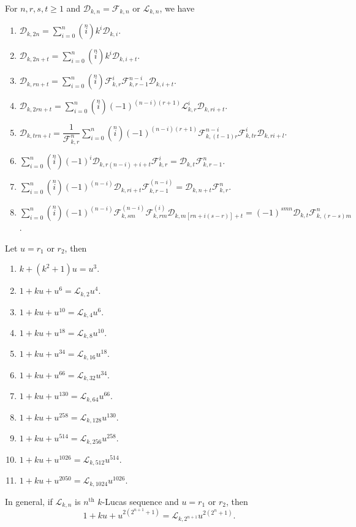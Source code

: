 \begin{theorem}For $n, r, s, t\geq 1$ and $\mathcal{D}_{k,n}=\mathcal{F}_{k,n}$ or $\mathcal{L}_{k,n}$, we have\label{3.3}
\begin{enumerate}
\item $\mathcal{D}_{k,2n}=\sum\limits_{i=0}^{n}\left( \stackrel{n}{i}\right) k^{i}\mathcal{D}_{k,i} $.
\item $\mathcal{D}_{k,2n+t}=\sum\limits_{i=0}^{n}\left( \stackrel{n}{i}\right) k^{i}\mathcal{D}_{k,i+t} $.
\item $\mathcal{D}_{k,rn+t}=\sum\limits_{i=0}^{n}\left( \stackrel{n}{i}\right) \mathcal{F}_{k,r}^{i}\mathcal{F}_{k,r-1}^{n-i}\mathcal{D}_{k,i+t} $.
\item $\mathcal{D}_{k,2rn+t}=\sum\limits_{i=0}^{n}\left( \stackrel{n}{i}\right)(-1)^{(n-i)(r+1)} \mathcal{L}_{k,r}^{i}\mathcal{D}_{k,ri+t} $.
\item $\mathcal{D}_{k,trn+l}=\dfrac{1}{\mathcal{F}_{k,r}^{n}}\sum\limits_{i=0}^{n}\left( \stackrel{n}{i}\right)(-1)^{(n-i)(r+1)} \mathcal{F}_{k,(t-1)r}^{n-i}\mathcal{F}_{k,tr}^{i}\mathcal{D}_{k,ri+l} $.
\item $\sum\limits_{i=0}^{n}\left( \stackrel{n}{i}\right)(-1)^{i} \mathcal{D}_{k,r(n-i)+i+t}\mathcal{F}_{k,r}^{i}=\mathcal{D}_{k,t}\mathcal{F}_{k,r-1}^{n} $.
\item $\sum\limits_{i=0}^{n}\left( \stackrel{n}{i}\right)(-1)^{(n-i)} \mathcal{D}_{k,ri+t}\mathcal{F}_{k,r-1}^{(n-i)}=\mathcal{D}_{k,n+t}\mathcal{F}_{k,r}^{n} $.
\item $\sum\limits_{i=0}^{n}\left( \stackrel{n}{i}\right)(-1)^{(n-i)}\mathcal{F}_{k,sm}^{(n-i)}\mathcal{F}_{k,rm}^{(i)} \mathcal{D}_{k,m[rn+i(s-r)]+t}=(-1)^{smn}\mathcal{D}_{k,t}\mathcal{F}_{k,(r-s)m}^{n} $.
\end{enumerate}
\end{theorem}
\begin{lemma}
Let $u=r_{1}$ or $r_{2}$, then\label{3.4}
\begin{enumerate}
\item $k+(k^2+1)u=u^3$.
\item $1+ku+u^6=\mathcal{L}_{k,2}u^4$.
\item $1+ku+u^{10}=\mathcal{L}_{k,4}u^6$.
\item $1+ku+u^{18}=\mathcal{L}_{k,8}u^{10}$.
\item $1+ku+u^{34}=\mathcal{L}_{k,16}u^{18}$.
\item $1+ku+u^{66}=\mathcal{L}_{k,32}u^{34}$.
\item $1+ku+u^{130}=\mathcal{L}_{k,64}u^{66}$.
\item $1+ku+u^{258}=\mathcal{L}_{k,128}u^{130}$.
\item $1+ku+u^{514}=\mathcal{L}_{k,256}u^{258}$.
\item $1+ku+u^{1026}=\mathcal{L}_{k,512}u^{514}$.
\item $1+ku+u^{2050}=\mathcal{L}_{k,1024}u^{1026}$.
\end{enumerate}
In general, if $\mathcal{L}_{k,n}$ is $n^{\text{th}}$ $k$-Lucas sequence and $u=r_{1}$ or $r_{2}$, then
$$1+ku+u^{2(2^{n+1}+1)}=\mathcal{L}_{k,2^{n+1}}u^{2(2^{n}+1)}.$$
\end{lemma}

